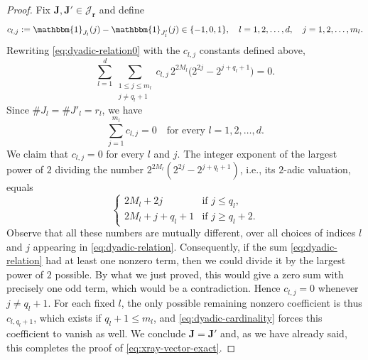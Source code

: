 \documentclass[11pt,reqno]{amsart}
\numberwithin{equation}{section}
\renewcommand{\leq}{\leqslant}
\renewcommand{\ge}{\geqslant}
\begin{document}
\begin{proof}
Fix $\mathbf{J},\mathbf{J}'\in\mathcal{J}_{\mathbf{r}}$ and define
\[ c_{l,j}:=\mathbbm{1}_{J_l}(j)-\mathbbm{1}_{J'_l}(j) \in\{-1,0,1\}, \quad l=1,2,\ldots,d, \quad j=1,2,\ldots,m_l. \]
Rewriting \eqref{eq:dyadic-relation0} with the $c_{l,j}$ constants defined above,
\begin{equation}\label{eq:dyadic-relation}
\sum_{l=1}^d \sum_{\substack{1\leq j\leq m_l\\ j\neq q_l+1}} c_{l,j} \,2^{2M_l} \bigl(2^{2j}-2^{j+q_l+1}\bigr) = 0.
\end{equation}
Since $\#J_l=\#J'_l=r_l$, we have
\begin{equation}\label{eq:dyadic-cardinality}
\sum_{j=1}^{m_l}c_{l,j}=0 \quad\text{for every }l=1,2,\ldots,d.
\end{equation}
We claim that $c_{l,j}=0$ for every $l$ and $j$. The integer exponent of the largest power of $2$ dividing the number $2^{2M_l}(2^{2j}-2^{j+q_l+1})$, i.e., its $2$-adic valuation, equals 
\[ \begin{cases}
2M_l+2j & \text{if } j\leq q_l,\\
2M_l+j+q_l+1 & \text{if } j\ge q_l+2.
\end{cases} \]
Observe that all these numbers are mutually different, over all choices of indices $l$ and $j$ appearing in \eqref{eq:dyadic-relation}. Consequently, if the sum \eqref{eq:dyadic-relation} had at least one nonzero term, then we could divide it by the largest power of $2$ possible. By what we just proved, this would give a zero sum with precisely one odd term, which would be a contradiction.
Hence $c_{l,j}=0$ whenever $j\neq q_l+1$. For each fixed $l$, the only possible remaining nonzero coefficient is thus $c_{l,q_l+1}$, which exists if $q_l+1\leq m_l$, and \eqref{eq:dyadic-cardinality} forces this coefficient to vanish as well.
We conclude $\mathbf{J}=\mathbf{J}'$ and, as we have already said, this completes the proof of \eqref{eq:xray-vector-exact}.


\end{proof}
\end{document}
